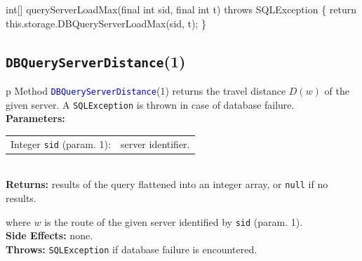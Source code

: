 \nwenddocs{}\endmoddef{}
int[] queryServerLoadMax(final int sid, final int t) throws SQLException \{
  return this.storage.DBQueryServerLoadMax(sid, t);
\}
\eatline
{}\nwendcode{}\nwdocspar
\subsection{\texttt{DBQueryServerDistance}(1)}
\begin{tabular}{p{\textwidth}}
\toprule
{}
Method \textcolor{blue}{{\tt{}\protect{}DBQueryServerDistance}}(1) returns the
travel distance $D(w)$ of the given server.
A {\tt{}SQLException} is thrown in case of database failure.\\
\midrule
\textbf{Parameters:} \\
\begin{tabular}{lp{116mm}}
Integer {\tt{}sid} (param. 1):&server identifier.
\end{tabular}\\
\textbf{Returns:} results of the query flattened into an integer array,
or {\tt{}null} if no results.


where $w$ is the route of the given server identified by {\tt{}sid} (param. 1).\\
\textbf{Side Effects:} none.\\
\textbf{Throws:} {\tt{}SQLException} if database failure is encountered.\\
\bottomrule
\end{tabular}
\nwenddocs{}\endmoddef{}
